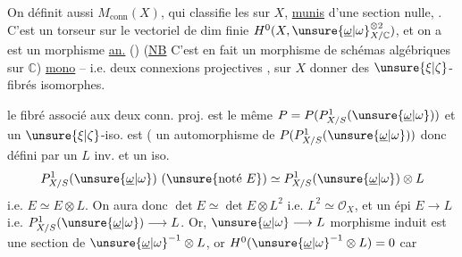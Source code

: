 On définit aussi $M_{\mathrm{conn}}(X)$, qui classifie les  sur $X$, \uline{munis} d'une section nulle, .  C'est un torseur sur le vectoriel de dim finie $H^0(X,\unsure{\underline{\omega}|\omega}^{\otimes2}_{X/\mathbb C})$, et on a
 est un morphisme \uline{an.} ()
(\uline{NB} C'est en fait un morphisme de schémas algébriques sur $\mathbb C$)
 \uline{mono} -- i.e. deux connexions projectives , sur $X$   donner des $\unsure{\xi|\zeta}$-fibrés isomorphes.

 le fibré  associé aux deux conn. proj. est le même $P=P(P^1_{X/S}(\unsure{\underline{\omega}|\omega}))$ et un $\unsure{\xi|\zeta}$-iso. est ( un automorphisme de $P(P^1_{X/S}(\unsure{\underline{\omega}|\omega}))$ donc défini par un $L$ inv. et un iso.
\[
P^1_{X/S}(\unsure{\underline{\omega}|\omega})\ (\unsure{\text{noté }E})\simeq P^1_{X/S}(\unsure{\underline{\omega}|\omega})\otimes L
\]
i.e. $E\simeq E\otimes L$. On aura donc $\det E\simeq\det E\otimes L^2$ i.e. $L^2\simeq\mathcal O_X$, et un épi $E\longrightarrow L$ i.e. $P^1_{X/S}(\unsure{\underline{\omega}|\omega})\longrightarrow L$. Or,   $\unsure{\underline{\omega}|\omega}\longrightarrow L$  morphisme induit est une section de $\unsure{\underline{\omega}|\omega}^{-1}\otimes L$, or $H^0(\unsure{\underline{\omega}|\omega}^{-1}\otimes L)=0$ car
